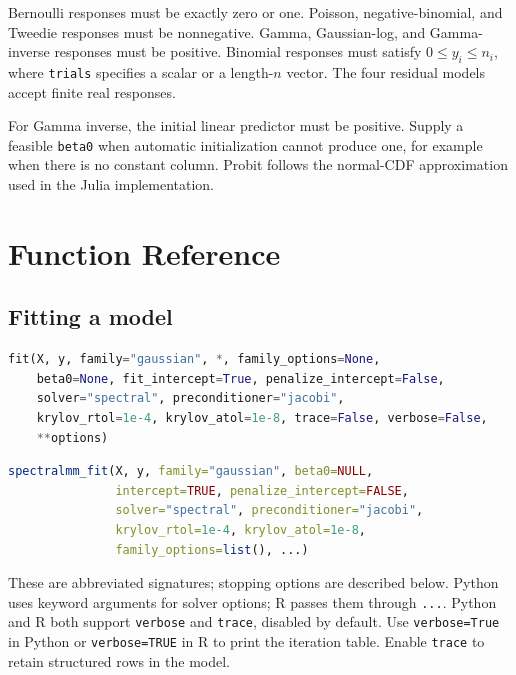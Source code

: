 \documentclass[11pt,a4paper]{article}
\newcommand{\code}[1]{\texttt{#1}}
\begin{document}
Bernoulli responses must be exactly zero or one. Poisson, negative-binomial,
and Tweedie responses must be nonnegative. Gamma, Gaussian-log, and Gamma-inverse
responses must be positive. Binomial responses must satisfy
$0\leq y_i\leq n_i$, where \code{trials} specifies a scalar or a length-$n$ vector.
The four residual models accept finite real responses.

For Gamma inverse, the initial linear predictor must be positive. Supply a
feasible \code{beta0} when automatic initialization cannot produce one, for
example when there is no constant column. Probit follows the normal-CDF
approximation used in the Julia implementation.

\section{Function Reference}
\subsection{Fitting a model}
\begin{lstlisting}[language=Python]
fit(X, y, family="gaussian", *, family_options=None,
    beta0=None, fit_intercept=True, penalize_intercept=False,
    solver="spectral", preconditioner="jacobi",
    krylov_rtol=1e-4, krylov_atol=1e-8, trace=False, verbose=False,
    **options)
\end{lstlisting}
\begin{lstlisting}[language=R]
spectralmm_fit(X, y, family="gaussian", beta0=NULL,
               intercept=TRUE, penalize_intercept=FALSE,
               solver="spectral", preconditioner="jacobi",
               krylov_rtol=1e-4, krylov_atol=1e-8,
               family_options=list(), ...)
\end{lstlisting}
These are abbreviated signatures; stopping options are described below.
Python uses keyword arguments for solver options; R passes them through
\code{...}. Python and R both support \code{verbose} and \code{trace}, disabled by default.
Use \code{verbose=True} in Python or \code{verbose=TRUE} in R to print the
iteration table. Enable \code{trace} to retain structured rows in the model.
\end{document}
